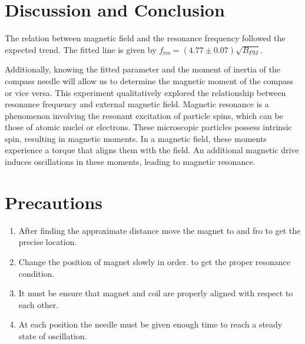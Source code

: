 \section{Discussion and Conclusion}
The relation between magnetic field and the resonance frequency followed the expected trend. The fitted line is given by $f_\text{res} = (4.77 \pm 0.07)\sqrt{B_{PM}}$.

Additionally, knowing the fitted parameter and the moment of inertia of the compass needle will allow us to determine the magnetic moment of the compass or vice versa. This experiment qualitatively explored the relationship between resonance frequency and external magnetic field. Magnetic resonance is a phenomenon involving the resonant excitation of particle spins, which can be those of atomic nuclei or electrons. These microscopic particles possess intrinsic spin, resulting in magnetic moments. In a magnetic field, these moments experience a torque that aligns them with the field. An additional magnetic drive induces oscillations in these moments, leading to magnetic resonance.

\section{Precautions}

    \begin{enumerate}
        \item After finding the approximate distance move the magnet to and fro to get the precise location.
        \item Change the position of magnet slowly in order.
        to get the proper resonance condition.
        \item  It must be ensure that magnet and coil are properly aligned with respect to each other.
        \item At each position the needle must be given enough time to reach a steady state of oscillation.
    \end{enumerate}

